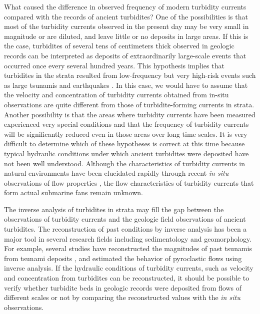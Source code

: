 What caused the difference in observed frequency of modern turbidity currents compared with the records of ancient turbidites? One of the possibilities is that most of the turbidity currents observed in the present day may be very small in magnitude or are diluted, and leave little or no deposits in large areas. If this is the case, turbidites of several tens of centimeters thick observed in geologic records can be interpreted as deposits of extraordinarily large-scale events that occurred once every several hundred years. This hypothesis implies that turbidites in the strata resulted from low-frequency but very high-risk events such as large tsunamis and earthquakes \citep{Goldfinger2003a}. In this case, we would have to assume that the velocity and concentration of turbidity currents obtained from in-situ observations are quite different from those of turbidite-forming currents in strata. Another possibility is that the areas where turbidity currents have been measured experienced very special conditions and that the frequency of turbidity currents will be significantly reduced even in those areas over long time scales. It is very difficult to determine which of these hypotheses is correct at this time because typical hydraulic conditions under which ancient turbidites were deposited have not been well understood. Although the characteristics of turbidity currents in natural environments have been elucidated rapidly through recent \textit{in situ} observations of flow properties \citep{Paull2018}, the flow characteristics of turbidity currents that form actual submarine fans remain unknown.

The inverse analysis of turbidites in strata may fill the gap between the observations of turbidity currents and the geologic field observations of ancient turbidites. The reconstruction of past conditions by inverse analysis has been a major tool in several research fields including sedimentology and geomorphology. For example, several studies have reconstructed the magnitudes of past tsunamis from tsunami deposits \citep{Jaffe2007, Naruse2017, Mitra2020a}, and \citet{Rossano1996} estimated the behavior of pyroclastic flows using inverse analysis. If the hydraulic conditions of turbidity currents, such as velocity and concentration from turbidites can be reconstructed, it should be possible to verify whether turbidite beds in geologic records were deposited from flows of different scales or not by comparing the reconstructed values with the \textit{in situ} observations. 

